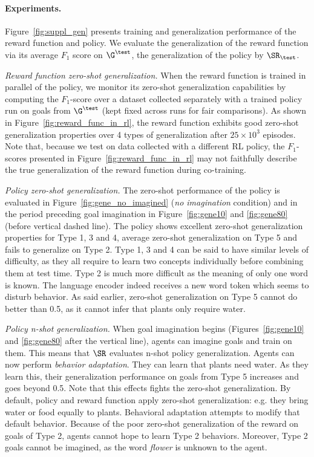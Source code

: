 \paragraph{Experiments.}
Figure~\ref{fig:suppl_gen} presents training and generalization performance of the reward function and policy. We evaluate the generalization of the reward function via its average $F_1$ score on $\G^\test$, the generalization of the policy by $\SR_\test$.


\textit{Reward function zero-shot generalization.}
When the reward function is trained in parallel of the policy, we monitor its zero-shot generalization capabilities by computing the $F_1$-score over a dataset collected separately with a trained policy run on goals from  $\G^\test$ (kept fixed across runs for fair comparisons). As shown in Figure~\ref{fig:reward_func_in_rl}, the reward function exhibits good zero-shot generalization properties over 4 types of generalization after $25 \times 10^3$ episodes. Note that, because we test on data collected with a different RL policy, the $F_1$-scores presented in Figure~\ref{fig:reward_func_in_rl} may not faithfully describe the true generalization of the reward function during co-training. 

\textit{Policy zero-shot generalization.}
The zero-shot performance of the policy is evaluated in Figure~\ref{fig:gene_no_imagined} (\textit{no imagination} condition) and in the period preceding goal imagination in Figure~\ref{fig:gene10} and \ref{fig:gene80} (before vertical dashed line). The policy shows excellent zero-shot generalization properties for Type 1, 3 and 4, average zero-shot generalization on Type 5 and fails to generalize on Type 2. Type 1, 3 and 4 can be said to have similar levels of difficulty, as they all require to learn two concepts individually before combining them at test time. Type 2 is much more difficult as the meaning of only one word is known. The language encoder indeed receives a new word token which seems to disturb behavior. As said earlier, zero-shot generalization on Type 5 cannot do better than 0.5, as it cannot infer that plants only require water.

\textit{Policy n-shot generalization.} When goal imagination begins (Figures~\ref{fig:gene10} and \ref{fig:gene80} after the vertical line), agents can imagine goals and train on them. This means that $\SR$ evaluates n-shot policy generalization. Agents can now perform \textit{behavior adaptation}. They can learn that plants need water. As they learn this, their generalization performance on goals from Type 5 increases and goes beyond 0.5. Note that this effects fights the zero-shot generalization. By default, policy and reward function apply zero-shot generalization: e.g. they bring water or food equally to plants. Behavioral adaptation attempts to modify that default behavior. Because of the poor zero-shot generalization of the reward on goals of Type 2, agents cannot hope to learn Type 2 behaviors. Moreover, Type 2 goals cannot be imagined, as the word \textit{flower} is unknown to the agent. 


